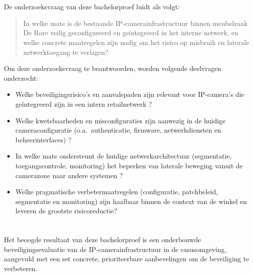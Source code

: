 \section{}%
\label{sec:onderzoeksvraag}

De onderzoeksvraag van deze bachelorproef luidt als volgt:

\begin{quote}
    In welke mate is de bestaande IP-camerainfrastructuur binnen meubelzaak De Rore veilig geconfigureerd en geïntegreerd in het interne netwerk, en welke concrete maatregelen zijn nodig om het risico op misbruik en laterale netwerktoegang te verlagen?
\end{quote}

Om deze onderzoeksvraag te beantwoorden, worden volgende deelvragen onderzocht:

\begin{itemize}
    \item Welke beveiligingsrisico’s en aanvalspaden zijn relevant voor IP-camera’s die geïntegreerd zijn in een intern retailnetwerk \parencite{ENISA2024ThreatLandscape}?
    \item Welke kwetsbaarheden en misconfiguraties zijn aanwezig in de huidige cameraconfiguratie (o.a.\ authenticatie, firmware, netwerkdiensten en beheerinterfaces) \parencite{Butun2019arXivIoTSecurity}?
    \item In welke mate ondersteunt de huidige netwerkarchitectuur (segmentatie, toegangscontrole, monitoring) het beperken van laterale beweging vanuit de camerazone naar andere systemen \parencite{Naprys2024Dahua}?
    \item Welke pragmatische verbetermaatregelen (configuratie, patchbeleid, segmentatie en monitoring) zijn haalbaar binnen de context van de winkel en leveren de grootste risicoreductie?
\end{itemize}

\section{}%
\label{sec:onderzoeksdoelstelling}

Het beoogde resultaat van deze bachelorproef is een onderbouwde beveiligingsevaluatie van de IP-camerainfrastructuur in de casusomgeving, aangevuld met een set concrete, prioriteerbare aanbevelingen om de beveiliging te verbeteren.

